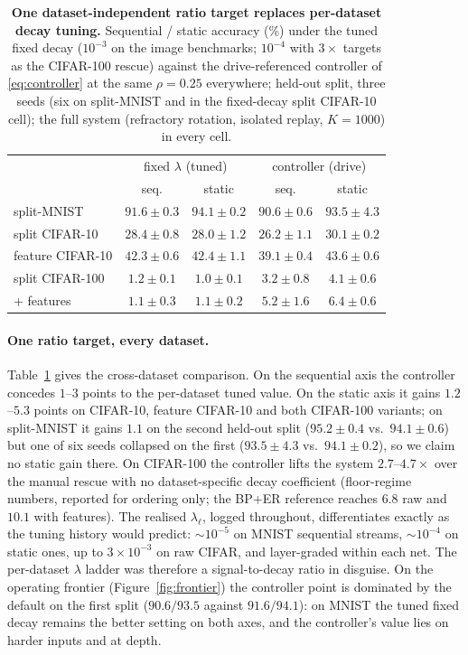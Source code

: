 \documentclass{article}
\begin{document}
\begin{table}[t]
\centering\small
\caption{\textbf{One dataset-independent ratio target replaces per-dataset decay tuning.} Sequential /
static accuracy (\%) under the tuned fixed decay ($10^{-3}$ on the image benchmarks;
$10^{-4}$ with $3\times$ targets as the CIFAR-100 rescue) against the drive-referenced
controller of \eqref{eq:controller} at the same $\rho=0.25$ everywhere; held-out split, three
seeds (six on split-MNIST and in the fixed-decay split CIFAR-10 cell); the full system
(refractory rotation, isolated replay, $K{=}1000$) in every cell.}
\label{tab:controller}
\begin{tabular}{lcccc}
\toprule
& \multicolumn{2}{c}{fixed $\lambda$ (tuned)} & \multicolumn{2}{c}{controller (drive)} \\
& seq. & static & seq. & static \\
\midrule
split-MNIST & $91.6\pm0.3$ & $94.1\pm0.2$ & $90.6\pm0.6$ & $93.5\pm4.3$ \\
split CIFAR-10 & $28.4\pm0.8$ & $28.0\pm1.2$ & $26.2\pm1.1$ & $30.1\pm0.2$ \\
feature CIFAR-10 & $42.3\pm0.6$ & $42.4\pm1.1$ & $39.1\pm0.4$ & $43.6\pm0.6$ \\
split CIFAR-100 & $1.2\pm0.1$ & $1.0\pm0.1$ & $3.2\pm0.8$ & $4.1\pm0.6$ \\
\quad + features & $1.1\pm0.3$ & $1.1\pm0.2$ & $5.2\pm1.6$ & $6.4\pm0.6$ \\
\bottomrule
\end{tabular}
\end{table}

\paragraph{One ratio target, every dataset.}
Table~\ref{tab:controller} gives the cross-dataset comparison. On the sequential axis the
controller concedes $1$--$3$ points to the per-dataset tuned value. On the static axis it
gains $1.2$--$5.3$ points on CIFAR-10, feature CIFAR-10 and both CIFAR-100 variants; on
split-MNIST it gains $1.1$ on the second held-out split ($95.2\pm0.4$ vs.\ $94.1\pm0.6$) but
one of six seeds collapsed on the first ($93.5\pm4.3$ vs.\ $94.1\pm0.2$), so we claim no
static gain there. On CIFAR-100 the controller lifts the system $2.7$--$4.7\times$ over the
manual rescue with no dataset-specific decay coefficient (floor-regime numbers, reported for
ordering only; the BP+ER reference reaches $6.8$ raw and $10.1$ with features). The realised
$\lambda_\ell$, logged throughout, differentiates exactly as the tuning history would
predict: $\sim\!10^{-5}$ on MNIST sequential streams, $\sim\!10^{-4}$ on static ones, up to
$3\times10^{-3}$ on raw CIFAR, and layer-graded within each net. The per-dataset $\lambda$
ladder was therefore a signal-to-decay ratio in disguise. On the operating frontier
(Figure~\ref{fig:frontier}) the controller point is dominated by the default on the first split
($90.6/93.5$ against $91.6/94.1$): on MNIST the tuned fixed decay remains the better setting on
both axes, and the controller's value lies on harder inputs and at depth.
\end{document}
